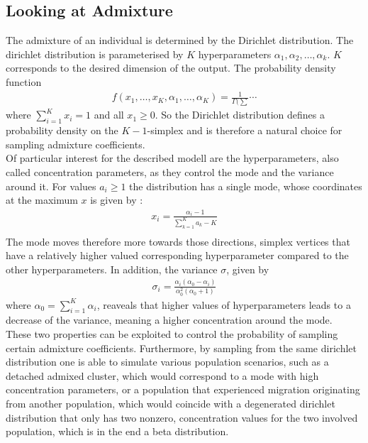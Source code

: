 \documentclass[a4paper, 11pt]{article}
\begin{document}
\subsection{Looking at Admixture}
The admixture of an individual is determined by the Dirichlet distribution. The dirichlet distribution is parameterised by $K$ hyperparameters $\alpha_1,\alpha_2, \ldots, \alpha_k$. $K$ corresponds to the desired dimension of the output. The probability density function
\begin{align*}
f(x_1, \ldots, x_K, \alpha_1, \ldots, \alpha_K) = \frac{1}{\Gamma(\sum} \cdots
\end{align*}
where $\sum^{K}_{i =1} x_i = 1$ and all $x_1 \geq 0$. So the Dirichlet distribution defines a probability density on the $K-1$-simplex and is therefore a natural choice for sampling admixture coefficients. \\
Of particular interest for the described modell are the hyperparameters, also called concentration parameters, as they control the mode and the variance around it. For values $a_i \geq 1$ the distribution has a single mode, whose coordinates at the maximum $x$ is given by \cite{bishop2006pattern}: 
\begin{align*}
x_i = \frac{\alpha_i - 1}{\sum^K_{k=1} a_k -K} \\
\end{align*}
The mode moves therefore more towards those directions, simplex vertices that have a relatively higher valued corresponding hyperparameter compared to the other hyperparameters. In addition, the variance $\sigma$, given by 
\begin{align*}
\sigma_i = \frac{\alpha_i(\alpha_0 - \alpha_i)}{\alpha_0^2(\alpha_0 + 1)}
\end{align*} 
where $\alpha_0 = \sum^{K}_{i = 1} \alpha_i$, reaveals that higher values of hyperparameters leads to a decrease of the variance, meaning a higher concentration around the mode. \\
These two properties can be exploited to control the probability of sampling certain admixture coefficients. Furthermore, by sampling from the same dirichlet distribution one is able to simulate various population scenarios, such as a detached admixed cluster, which would correspond to a mode with high concentration parameters, or a population that experienced migration originating from another population, which would coincide with a degenerated dirichlet distribution that only has two nonzero, concentration values for the two involved population, which is in the end a beta distribution.
\end{document}
